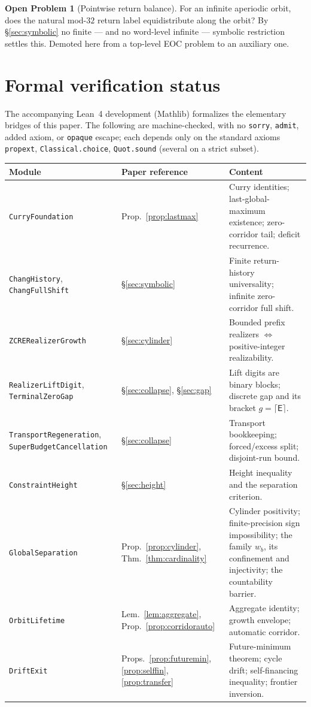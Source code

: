 \documentclass[11pt]{article}
\theoremstyle{plain}
\theoremstyle{definition}
\newtheorem{openproblem}{Open Problem}
\theoremstyle{remark}
\newcommand{\Edep}{\mathsf{E}}          %
\begin{document}
\begin{openproblem}[Pointwise return balance]\label{op:H}
For an infinite aperiodic orbit, does the natural mod-$32$ return label equidistribute along the
orbit? By \S\ref{sec:symbolic} no finite --- and no word-level infinite --- symbolic restriction
settles this. Demoted here from a top-level EOC problem to an auxiliary one.
\end{openproblem}

\section{Formal verification status}\label{sec:lean}

The accompanying Lean~4 development (Mathlib) formalizes the elementary bridges of this paper. The
following are machine-checked, with no \texttt{sorry}, \texttt{admit}, added axiom, or
\texttt{opaque} escape; each depends only on the standard axioms \texttt{propext},
\texttt{Classical.choice}, \texttt{Quot.sound} (several on a strict subset).

\begin{center}
\small
\begin{tabular}{@{}llp{}@{}}
\toprule
Module & Paper reference & Content \\
\midrule
\texttt{CurryFoundation} & Prop.~\ref{prop:lastmax} & Curry identities; last-global-maximum
existence; zero-corridor tail; deficit recurrence. \\
\texttt{ChangHistory}, \texttt{ChangFullShift} & \S\ref{sec:symbolic} & Finite return-history
universality; infinite zero-corridor full shift. \\
\texttt{ZCRERealizerGrowth} & \S\ref{sec:cylinder} & Bounded prefix realizers $\iff$
positive-integer realizability. \\
\texttt{RealizerLiftDigit}, \texttt{TerminalZeroGap} & \S\ref{sec:collapse}, \S\ref{sec:gap} &
Lift digits are binary blocks; discrete gap and its bracket $g=\lceil\Edep\rceil$. \\
\texttt{TransportRegeneration}, \texttt{SuperBudgetCancellation} & \S\ref{sec:collapse} &
Transport bookkeeping; forced/excess split; disjoint-run bound. \\
\texttt{ConstraintHeight} & \S\ref{sec:height} & Height inequality and the separation criterion. \\
\texttt{GlobalSeparation} & Prop.~\ref{prop:cylinder}, Thm.~\ref{thm:cardinality} & Cylinder
positivity; finite-precision sign impossibility; the family $w_b$, its confinement and
injectivity; the countability barrier. \\
\texttt{OrbitLifetime} & Lem.~\ref{lem:aggregate}, Prop.~\ref{prop:corridorauto} & Aggregate
identity; growth envelope; automatic corridor. \\
\texttt{DriftExit} & Props.~\ref{prop:futuremin}, \ref{prop:selffin}, \ref{prop:transfer} &
Future-minimum theorem; cycle drift; self-financing inequality; frontier inversion. \\
\bottomrule
\end{tabular}
\end{center}
\end{document}
